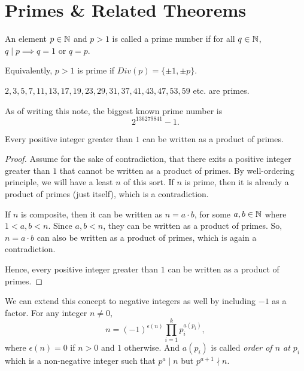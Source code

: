 \section{Primes \& Related Theorems}
\begin{definition}
    An element $p\in\mathbb{N}$ and $p > 1$ is called a prime number if for all $q \in \mathbb{N}$, $q \mid p \implies q = 1$ or $q = p$.
\end{definition}
Equivalently, $p > 1$ is prime if $Div(p) = \{\pm 1, \pm p\}$.
\begin{eg}
$2, 3, 5, 7, 11, 13, 17, 19, 23, 29, 31, 37, 41, 43, 47, 53, 59$ etc. are primes.
\end{eg}
\begin{eg}
    As of writing this note, the biggest known prime number is \[2^{136279841}-1.\]
\end{eg}
\begin{theorem}
    Every positive integer greater than $1$ can be written as a product of primes.
\end{theorem}
\begin{proof}
    Assume for the sake of contradiction, that there exits a positive integer greater than $1$ that cannot be written as a product of primes. By well-ordering principle, we will have a least $n$ of this sort. If $n$ is prime, then it is already a product of primes (just itself), which is a contradiction. 

    If $n$ is composite, then it can be written as $n = a \cdot b$, for some $a,b \in \mathbb{N}$ where $1 < a,b < n$. Since $a,b < n$, they can be written as a product of primes. So, $n = a \cdot b$ can also be written as a product of primes, which is again a contradiction.
    
    Hence, every positive integer greater than $1$ can be written as a product of primes.
\end{proof}
We can extend this concept to negative integers as well by including $-1$ as a factor.  
For any integer $n \neq 0$,
\[
n = (-1)^{\epsilon(n)} \prod_{i=1}^{k} p_i^{a(p_i)},
\]
where $\epsilon(n) = 0$ if $n > 0$ and $ 1$ otherwise. And $a(p_i)$ is called \textit{order of $n$ at $p_i$} which is a non-negative integer such that $p^a \mid n$ but $p^{a+1} \nmid n$.

